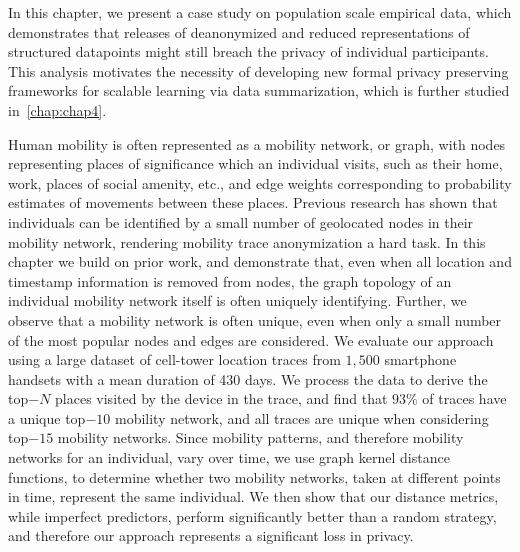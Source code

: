 
In this chapter, we present a case study on population scale empirical data, which demonstrates that releases of deanonymized and reduced representations of structured datapoints might still breach the privacy of individual participants. This analysis motivates the necessity of developing new formal privacy preserving frameworks for scalable learning via data summarization, which is further studied in~\cref{chap:chap4}.

{Human mobility is often represented as a mobility network, or graph, with nodes representing places of significance which an individual visits, such as their home, work, places of social amenity, etc., and edge weights corresponding to probability estimates of movements between these places.
Previous research has shown that individuals can be identified by a small number of geolocated nodes in their mobility network, rendering mobility trace anonymization a hard task.
In this chapter we build on prior work, and demonstrate that, even when all location and timestamp information is removed from nodes, the graph topology of an individual mobility network itself is often uniquely identifying. 
Further, we observe that a mobility network is often unique, even when only a small number of the most popular nodes and edges are considered. 
We evaluate our approach using a large dataset of cell-tower location traces from $1,500$ smartphone handsets with a mean duration of 430 days.
We process the data to derive the top$-N$ places visited by the device in the trace, and find that $93\%$ of traces have a unique top$-10$ mobility network, and all traces are unique when considering top$-15$ mobility networks.
Since mobility patterns, and therefore mobility networks for an individual, vary over time, we use graph kernel distance functions, to determine whether two mobility networks, taken at different points in time, represent the same individual.
We then show that our distance metrics, while imperfect predictors, perform significantly better than a random strategy, and therefore our approach represents a significant loss in privacy.}

